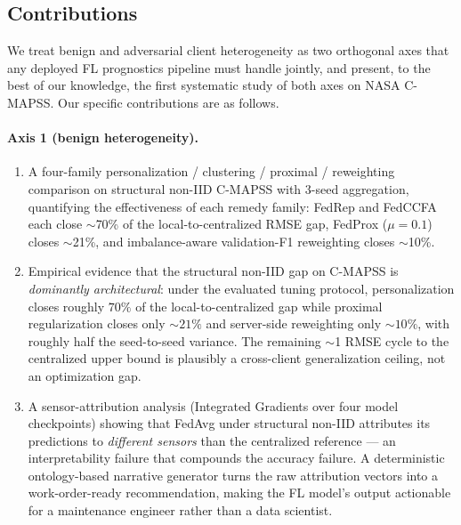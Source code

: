 \documentclass[preprint,12pt,authoryear]{elsarticle}
\begin{document}
\subsection{Contributions}
\label{subsec:contributions}

We treat benign and adversarial client heterogeneity as two
orthogonal axes that any deployed FL prognostics pipeline must
handle jointly, and present, to the best of our knowledge, the
first systematic study of both axes on NASA C-MAPSS. Our specific
contributions are as follows.

\paragraph{Axis 1 (benign heterogeneity).}
\begin{enumerate}
    \item A four-family personalization / clustering / proximal /
    reweighting comparison on structural non-IID C-MAPSS with
    3-seed aggregation, quantifying the effectiveness of each
    remedy family: FedRep and FedCCFA each close $\sim$70\% of the
    local-to-centralized RMSE gap, FedProx ($\mu = 0.1$) closes
    $\sim$21\%, and imbalance-aware validation-F1 reweighting
    closes $\sim$10\%.

    \item Empirical evidence that the structural non-IID gap on
    C-MAPSS is \emph{dominantly architectural}: under the evaluated
    tuning protocol, personalization closes roughly $70\%$ of the
    local-to-centralized gap while proximal regularization closes
    only $\sim 21\%$ and server-side reweighting only $\sim 10\%$,
    with roughly half the seed-to-seed variance. The remaining
    $\sim$1 RMSE cycle to the centralized upper bound is plausibly
    a cross-client generalization ceiling, not an optimization gap.

    \item A sensor-attribution analysis (Integrated Gradients over
    four model checkpoints) showing that FedAvg under structural
    non-IID attributes its predictions to \emph{different sensors}
    than the centralized reference --- an interpretability failure
    that compounds the accuracy failure. A deterministic
    ontology-based narrative generator turns the raw attribution
    vectors into a work-order-ready recommendation, making the FL
    model's output actionable for a maintenance engineer rather
    than a data scientist.
\end{enumerate}
\end{document}
